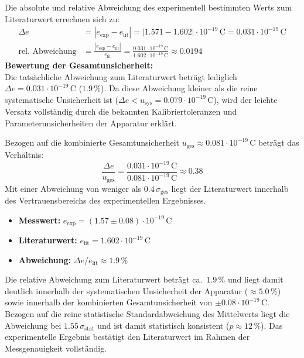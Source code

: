 \documentclass[12pt,a4paper,titlepage]{scrartcl}
\numberwithin{equation}{section}
\numberwithin{table}{section}
\numberwithin{figure}{section}
\begin{document}
\noindent
Die absolute und relative Abweichung des experimentell bestimmten Werts zum Literaturwert errechnen sich zu:
\begin{align}
    \Delta e &= |e_{\text{exp}} - e_{\text{lit}}| = |1.571 - 1.602| \cdot 10^{-19}\,\text{C} = 0.031 \cdot 10^{-19}\,\text{C} \\
    \text{rel.~Abweichung} &= \frac{|e_{\text{exp}} - e_{\text{lit}}|}{e_{\text{lit}}} = \frac{0.031 \cdot 10^{-19}\,\text{C}}{1.602 \cdot 10^{-19}\,\text{C}} \approx 0.0194
\end{align}
\medskip
\noindent
\textbf{Bewertung der Gesamtunsicherheit:}\\
Die tatsächliche Abweichung zum Literaturwert beträgt lediglich $\Delta e = 0.031 \cdot 10^{-19}\,\text{C}$ ($1.9\,\%$). Da diese Abweichung kleiner als die reine systematische Unsicherheit ist ($\Delta e < u_{\text{sys}} = 0.079 \cdot 10^{-19}\,\text{C}$), wird der leichte Versatz vollständig durch die bekannten Kalibriertoleranzen und Parameterunsicherheiten der Apparatur erklärt. 

\noindent
Bezogen auf die kombinierte Gesamtunsicherheit $u_{\text{ges}} \approx 0.081 \cdot 10^{-19}\,\text{C}$ beträgt das Verhältnis:
\begin{equation}
    \frac{\Delta e}{u_{\text{ges}}} = \frac{0.031 \cdot 10^{-19}\,\text{C}}{0.081 \cdot 10^{-19}\,\text{C}} \approx 0.38
\end{equation}
Mit einer Abweichung von weniger als $0.4\,\sigma_{\text{ges}}$ liegt der Literaturwert innerhalb des Vertrauensbereichs des experimentellen Ergebnisses.
\medskip
\begin{resultbox}
    \begin{itemize}
        \item \textbf{Messwert:} $e_{\text{exp}} = (1.57 \pm 0.08) \cdot 10^{-19}\,\text{C}$
        \item \textbf{Literaturwert:} $e_{\text{lit}} = 1.602 \cdot 10^{-19}\,\text{C}$
        \item \textbf{Abweichung:} $\Delta e / e_{\text{lit}} \approx 1.9\,\%$
    \end{itemize}
    Die relative Abweichung zum Literaturwert beträgt ca.~$1.9\,\%$ und liegt damit deutlich innerhalb der systematischen Unsicherheit der Apparatur ($\approx 5.0\,\%$) sowie innerhalb der kombinierten Gesamtunsicherheit von $\pm 0.08 \cdot 10^{-19}\,\text{C}$. Bezogen auf die reine statistische Standardabweichung des Mittelwerts liegt die Abweichung bei $1.55\,\sigma_{\text{stat}}$ und ist damit statistisch konsistent ($p \approx 12\,\%$). Das experimentelle Ergebnis bestätigt den Literaturwert im Rahmen der Messgenauigkeit vollständig.
\end{resultbox}
\end{document}
